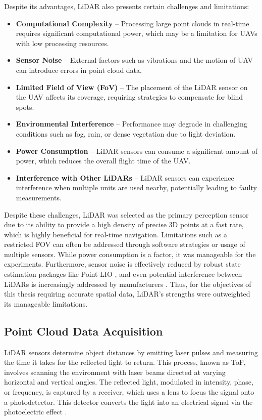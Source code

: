             Despite its advantages, \ac{LiDAR} also presents certain challenges and limitations:  
            \begin{itemize}  
                \item \textbf{Computational Complexity} -- Processing large point clouds in real-time requires significant computational power, which may be a limitation for \ac{UAV}s with low processing resources.
                \item \textbf{Sensor Noise} -- External factors such as vibrations and the motion of \ac{UAV} can introduce errors in point cloud data.  
                \item \textbf{Limited Field of View (FoV)} -- The placement of the \ac{LiDAR} sensor on the \ac{UAV} affects its coverage, requiring strategies to compensate for blind spots.  
                \item \textbf{Environmental Interference} -- Performance may degrade in challenging conditions such as fog, rain, or dense vegetation due to light deviation.  
                \item \textbf{Power Consumption} -- \ac{LiDAR} sensors can consume a significant amount of power, which reduces the overall flight time of the \ac{UAV}.
                \item \textbf{Interference with Other LiDARs} -- \ac{LiDAR} sensors can experience interference when multiple units are used nearby, potentially leading to faulty measurements.
            \end{itemize}

            Despite these challenges, \ac{LiDAR} was selected as the primary perception sensor due to its ability to provide a high density of precise 3D points at a fast rate, which is highly beneficial for real-time navigation.
            Limitations such as a restricted \ac{FOV} can often be addressed through software strategies or usage of multiple sensors. 
            While power consumption is a factor, it was manageable for the experiments. 
            Furthermore, sensor noise is effectively reduced by robust state estimation packages like \ac{Point-LIO} \cite{point_lio_paper}, and even potential interference between \ac{LiDAR}s is increasingly addressed by manufacturers \cite{livox_mid360}. 
            Thus, for the objectives of this thesis requiring accurate spatial data, \ac{LiDAR}'s strengths were outweighted its manageable limitations.

        \subsection{Point Cloud Data Acquisition}
            \ac{LiDAR} sensors determine object distances by emitting laser pulses and measuring the time it takes for the reflected light to return. 
            This process, known as \ac{ToF}, involves scanning the environment with laser beams directed at varying horizontal and vertical angles. 
            The reflected light, modulated in intensity, phase, or frequency, is captured by a receiver, which uses a lens to focus the signal onto a photodetector. 
            This detector converts the light into an electrical signal via the photoelectric effect \cite{lidar_how_works}.

